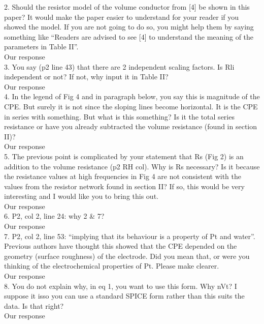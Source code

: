 \documentclass[journal, a4paper]{IEEEtran}
\begin{document}
{2. Should the resistor model of the volume conductor from [4] be shown in this paper? It would make the paper easier to understand for your reader if you showed the model. If you are not going to do so, you might help them by saying something like ``Readers are advised to see [4] to understand the meaning of the parameters in Table II''.\\
{\color{OliveGreen} Our response}\\

3. You say (p2 line 43) that there are 2 independent scaling factors. Is Rli independent or not? If not, why input it in Table II?\\
{\color{OliveGreen} Our response}\\

4. In the legend of Fig 4 and in paragraph below, you say this is magnitude of the CPE. But surely it is not since the sloping lines become horizontal. It is the CPE in series with something. But what is this something? Is it the total series resistance or have you already subtracted the volume resistance (found in section II)?\\
{\color{OliveGreen} Our response}\\

5. The previous point is complicated by your statement that Rs (Fig 2) is an addition to the volume resistance (p2 RH col). Why is Rs necessary? Is it because the resistance values at high frequencies in Fig 4 are not consistent with the values from the resistor network found in section II? If so, this would be very interesting and I would like you to bring this out.\\
{\color{OliveGreen} Our response}\\

6. P2, col 2, line 24: why 2 & 7?\\
{\color{OliveGreen} Our response}\\

7. P2, col 2, line 53: ``implying that its behaviour is a property of Pt and water''. Previous authors have thought this showed that the CPE depended on the geometry (surface roughness) of the electrode. Did you mean that, or were you thinking of the electrochemical properties of Pt. Please make clearer.\\
{\color{OliveGreen} Our response}\\

8. You do not explain why, in eq 1, you want to use this form. Why nVt? I suppose it isso you can use a standard SPICE form rather than this suits the data. Is that right?\\
{\color{OliveGreen} Our response}\\

}
\end{document}
